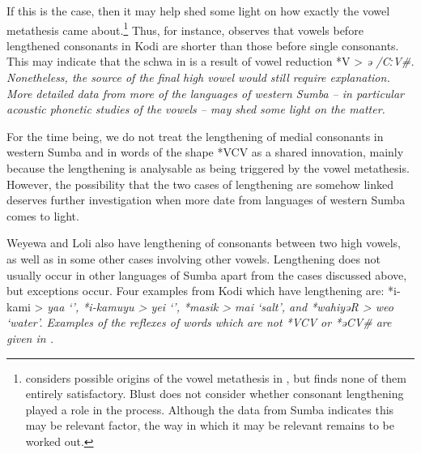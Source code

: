 If this is the case, then it may help shed some light
on how exactly the  vowel metathesis
came about.\footnote{
		\citet[220--229]{Blust2012a} considers possible
		origins of the vowel metathesis in ,
		but finds none of them entirely satisfactory.
		Blust does not consider whether consonant lengthening played a
		role in the process.
		Although the data from Sumba indicates this may be relevant factor,
		the way in which it may be relevant remains to be worked out.}
Thus, for instance, \citet[48]{Lovestrand2021} observes that
vowels before lengthened consonants in Kodi are shorter than those before single consonants.
This may indicate that the schwa in  is a result
of vowel reduction *V\tsc{[+high]} > \it{ə} /{\gap}CːV{\#}.
Nonetheless, the source of the final high vowel would still require explanation.
More detailed data from more of the languages of western Sumba -- in
particular acoustic phonetic studies of the vowels -- may shed
some light on the matter.

For the time being, we do not treat the lengthening
of medial consonants in western Sumba and 
in words of the shape *V\tsc{[+high]}CV\tsc{[+low]} as
a shared innovation, mainly because the 
lengthening is analysable as being triggered by the vowel metathesis.
However, the possibility that the two cases of lengthening are
somehow linked deserves further investigation when more
date from languages of western Sumba comes to light.


Weyewa and Loli also have lengthening of consonants between two
high vowels, as well as in some other cases involving other vowels.
Lengthening does not usually occur in other languages of Sumba
apart from the cases discussed above, but exceptions occur.
Four examples from Kodi which have lengthening are: *i-kami >
\it{yaa} ‘’, *i-kamuyu > \it{yei} ‘’,
*masik > \it{mai} ‘salt’,
and *wahiyəR > \it{weo} ‘water’.
Examples of the reflexes of words which are not *V\tsc{[+high]}CV\tsc{[+low]}{\#}
or *əCV{\#} are given in .

